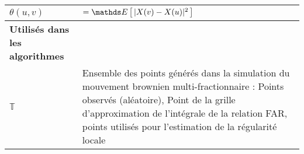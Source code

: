 \begin{table}[H]
\begin{tabularx}{\textwidth}{lX}
		$\theta(u,v)$     & $= \esperance{ |X(v) - X(u)|^2 }$                                                                                                                                                               \\
		\toprule
		\textbf{Utilisés dans les algorithmes}                                                                                                                                                                              \\
		\midrule
		$\mathds T$               & Ensemble des points générés dans la simulation du mouvement brownien multi-fractionnaire : Points observés (aléatoire), Point de la grille d'approximation de l'intégrale de la relation FAR, points utilisés pour l'estimation de la régularité locale                                                                                                        \\
		\bottomrule
	\end{tabularx}
\end{table}
